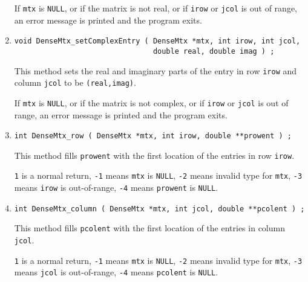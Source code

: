 \begin{enumerate}
If {\tt mtx} is {\tt NULL},
or if the matrix is not real,
or if {\tt irow} or {\tt jcol} is out of range,
an error message is printed and the program exits.
\item
\begin{verbatim}
void DenseMtx_setComplexEntry ( DenseMtx *mtx, int irow, int jcol, 
                                double real, double imag ) ;
\end{verbatim}
This method sets the real and imaginary parts of the entry in row
{\tt irow} and column {\tt jcol} to be {\tt (real,imag)}.
\par {}
If {\tt mtx} is {\tt NULL},
or if the matrix is not complex,
or if {\tt irow} or {\tt jcol} is out of range,
an error message is printed and the program exits.
\item
\begin{verbatim}
int DenseMtx_row ( DenseMtx *mtx, int irow, double **prowent ) ;
\end{verbatim}
This method fills {\tt *prowent} with the first location of the
entries in row {\tt irow}.
\par {}
{\tt 1} is a normal return,
{\tt -1} means {\tt mtx} is {\tt NULL},
{\tt -2} means invalid type for {\tt mtx},
{\tt -3} means {\tt irow} is out-of-range,
{\tt -4} means {\tt prowent} is {\tt NULL}.
\item
\begin{verbatim}
int DenseMtx_column ( DenseMtx *mtx, int jcol, double **pcolent ) ;
\end{verbatim}
This method fills {\tt *pcolent} with the first location of the
entries in column {\tt jcol}.
\par {}
{\tt 1} is a normal return,
{\tt -1} means {\tt mtx} is {\tt NULL},
{\tt -2} means invalid type for {\tt mtx},
{\tt -3} means {\tt jcol} is out-of-range,
{\tt -4} means {\tt pcolent} is {\tt NULL}.
\end{enumerate}
\par
